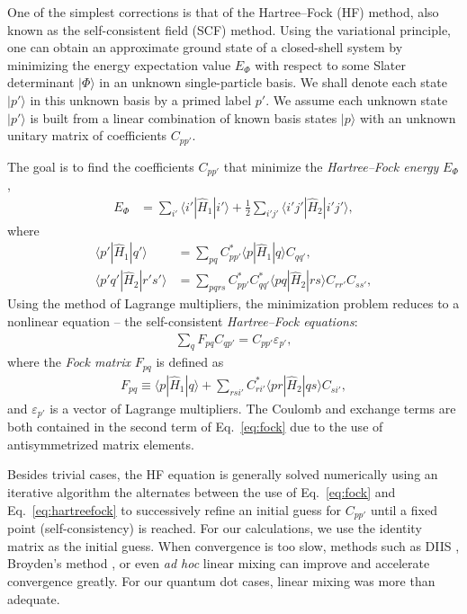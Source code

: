 \documentclass[thesis.tex]{subfiles}
\begin{document}
One of the simplest corrections is that of the Hartree--Fock (HF) method, also known as the self-consistent field (SCF) method.  Using the variational principle, one can obtain an approximate ground state of a closed-shell system by minimizing the energy expectation value $E_{\Phi}$ with respect to some Slater determinant $|\Phi\rangle$ in an unknown single-particle basis.  We shall denote each state $|p'\rangle$ in this unknown basis by a primed label $p'$.  We assume each unknown state $|p'\rangle$ is built from a linear combination of known basis states $|p\rangle$ with an unknown unitary matrix of coefficients $C_{p p'}$.

The goal is to find the coefficients $C_{p p'}$ that minimize the \textit{Hartree--Fock energy} $E_{\Phi}$,
\begin{align}
  E_{\Phi} &= \sum_{i'} \langle i' | \hat{H}_1 | i' \rangle + \frac{1}{2} \sum_{i' j'} \langle i' j' | \hat{H}_2 | i' j' \rangle \label{eq:hfenergy},
\end{align}
where
\begin{align}
  \langle p' | \hat{H}_1 | q' \rangle &= \sum_{p q} C_{p p'}^* \langle p | \hat{H}_1 | q \rangle C_{q q'}^{}, \label{eq:hftransform1} \\
  \langle p' q' | \hat{H}_2 | r' s' \rangle &= \sum_{p q r s} C_{p p'}^* C_{q q'}^* \langle p q | \hat{H}_2 | r s \rangle C_{r r'}^{} C_{s s'}^{}, \label{eq:hftransform2}
\end{align}
Using the method of Lagrange multipliers, the minimization problem reduces to a nonlinear equation -- the self-consistent \textit{Hartree--Fock equations}:
\begin{align} \label{eq:hartreefock}
  \sum_q F_{p q} C_{q p'} = C_{p p'} \varepsilon_{p'},
\end{align}
where the \textit{Fock matrix} $F_{p q}$ is defined as
\begin{align} \label{eq:fock}
  F_{p q} \equiv \langle p | \hat{H}_1 | q \rangle + \sum_{r s i'} C_{r i'}^* \langle p r | \hat{H}_2 | q s \rangle C_{s i'}^{},
\end{align}
and $\varepsilon_{p'}$ is a vector of Lagrange multipliers.  The Coulomb and exchange terms are both contained in the second term of Eq.\ \eqref{eq:fock} due to the use of antisymmetrized matrix elements.

Besides trivial cases, the HF equation is generally solved numerically using an iterative algorithm the alternates between the use of Eq.\ \eqref{eq:fock} and Eq.\ \eqref{eq:hartreefock} to successively refine an initial guess for $C_{p p'}$ until a fixed point (self-consistency) is reached.  For our calculations, we use the identity matrix as the initial guess.  When convergence is too slow, methods such as DIIS \cite{PULAY1980393,PULAY1982556}, Broyden's method \cite{BROYDEN1965557}, or even \textit{ad hoc} linear mixing can improve and accelerate convergence greatly.  For our quantum dot cases, linear mixing was more than adequate.
\end{document}
